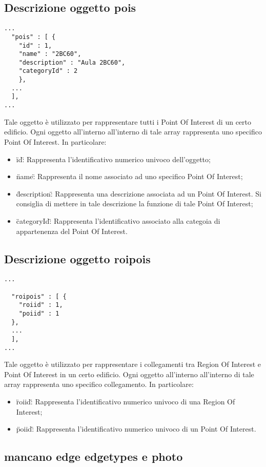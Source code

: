 \documentclass[../ManualeSviluppatore.tex]{subfiles}
\begin{document}
		\subsection{Descrizione oggetto pois}
		\begin{lstlisting}
...
  "pois" : [ {
	"id" : 1,
	"name" : "2BC60",
	"description" : "Aula 2BC60",
	"categoryId" : 2
    }, 
  ...
  ],
...
		\end{lstlisting}
		Tale oggetto è utilizzato per rappresentare tutti i Point Of Interest di un certo edificio. Ogni oggetto all'interno all'interno di tale array rappresenta uno specifico Point Of Interest. In particolare:
		\begin{itemize}
			\item \"id\": Rappresenta l'identificativo numerico univoco dell'oggetto;
			\item \"name\": Rappresenta il nome associato ad uno specifico Point Of Interest;
			\item \"description\": Rappresenta una descrizione associata ad un Point Of Interest. Si consiglia di mettere in tale descrizione la funzione di tale Point Of Interest;
			\item \"categoryId\": Rappresenta l'identificativo associato alla categoia di appartenenza del Point Of Interest.
		\end{itemize}
	\subsection{Descrizione oggetto roipois}
		\begin{lstlisting}
...
  
  "roipois" : [ {
	"roiid" : 1,
	"poiid" : 1
  },  
  ...
  ],
...
		\end{lstlisting}
		Tale oggetto è utilizzato per rappresentare i collegamenti tra Region Of Interest e Point Of Interest in un certo edificio. Ogni oggetto all'interno all'interno di tale array rappresenta uno specifico collegamento. In particolare:
		\begin{itemize}
			\item \"roiid\": Rappresenta l'identificativo numerico univoco di una Region Of Interest;
			\item \"poiid\": Rappresenta l'identificativo numerico univoco di un Point Of Interest.
		\end{itemize}

		\subsection{mancano edge edgetypes e photo}
\end{document}
